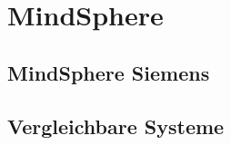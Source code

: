 \chapter{MindSphere}
\label{cha:mindsphere}

\section{MindSphere Siemens}

\section{Vergleichbare Systeme}






